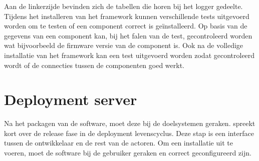 Aan de linkerzijde bevinden zich de tabellen die horen bij het logger gedeelte.
Tijdens het installeren van het framework kunnen verschillende tests uitgevoerd worden om te testen of een component correct is geïnstalleerd.
Op basis van de gegevens van een component kan, bij het falen van de test, gecontroleerd worden wat bijvoorbeeld de firmware versie van de component is.
Ook na de volledige installatie van het framework kan een test uitgevoerd worden zodat gecontroleerd wordt of de connecties tussen de componenten goed werkt.

\section{Deployment server}
Na het packagen van de software, moet deze bij de doelsystemen geraken.
\citet{softwareDeployment} spreekt kort over de release fase in de deployment levenscyclus.
Deze stap is een interface tussen de ontwikkelaar en de rest van de actoren.
Om een installatie uit te voeren, moet de software bij de gebruiker geraken en correct geconfigureerd zijn.

